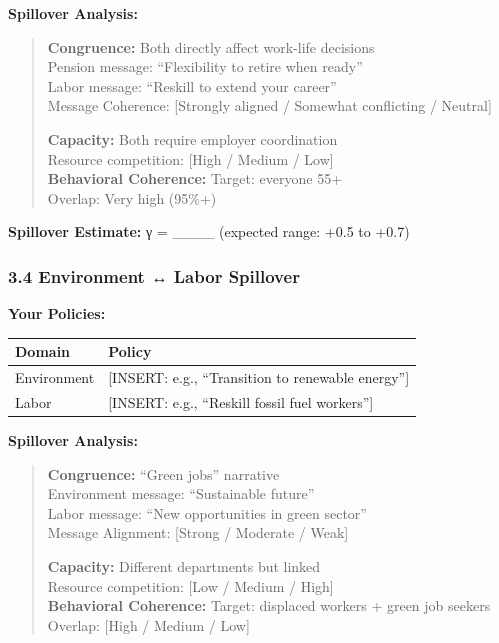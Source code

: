 \textbf{Spillover Analysis:}

\begin{quote}
\textbf{Congruence:} Both directly affect work-life decisions \\
Pension message: ``Flexibility to retire when ready'' \\
Labor message: ``Reskill to extend your career'' \\
Message Coherence: [Strongly aligned / Somewhat conflicting / Neutral]

\textbf{Capacity:} Both require employer coordination \\
Resource competition: [High / Medium / Low] \\

\textbf{Behavioral Coherence:} Target: everyone 55+ \\
Overlap: Very high (95\%+)
\end{quote}

\textbf{Spillover Estimate:} γ = \_\_\_\_ (expected range: +0.5 to +0.7)

\subsubsection*{3.4 Environment ↔ Labor Spillover}

\textbf{Your Policies:}
\begin{center}
\begin{tabular}{@{}ll@{}}
\toprule
\textbf{Domain} & \textbf{Policy} \\
\midrule
Environment & [INSERT: e.g., ``Transition to renewable energy''] \\
Labor & [INSERT: e.g., ``Reskill fossil fuel workers''] \\
\midrule
\end{tabular}
\end{center}

\textbf{Spillover Analysis:}

\begin{quote}
\textbf{Congruence:} ``Green jobs'' narrative \\
Environment message: ``Sustainable future'' \\
Labor message: ``New opportunities in green sector'' \\
Message Alignment: [Strong / Moderate / Weak]

\textbf{Capacity:} Different departments but linked \\
Resource competition: [Low / Medium / High] \\

\textbf{Behavioral Coherence:} Target: displaced workers + green job seekers \\
Overlap: [High / Medium / Low]
\end{quote}

